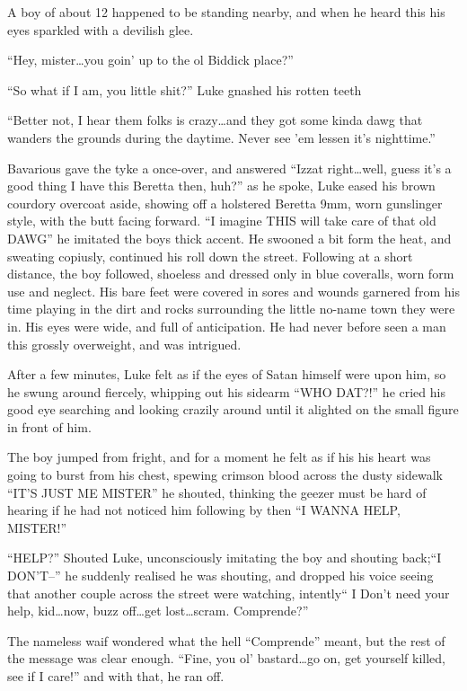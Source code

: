A boy of about 12 happened to be standing nearby, and when he heard
this his eyes sparkled with a devilish glee.

``Hey, mister{\ldots}you goin' up to the ol Biddick place?''

``So what if I am, you little shit?'' Luke gnashed his rotten
teeth

``Better not, I hear them folks is crazy{\ldots}and they got some kinda
dawg that wanders the grounds during the daytime. Never see 'em
lessen it's nighttime.''

Bavarious gave the tyke a once-over, and answered ``Izzat
right{\ldots}well, guess it's a good thing I have this Beretta then,
huh?'' as he spoke, Luke eased his brown courdory overcoat aside,
showing off a holstered Beretta 9mm, worn gunslinger style, with
the butt facing forward. ``I imagine THIS will take care of that old
DAWG'' he imitated the boys thick accent. He swooned a bit form the
heat, and sweating copiusly, continued his roll down the street.
Following at a short distance, the boy followed, shoeless and
dressed only in blue coveralls, worn form use and neglect. His bare
feet were covered in sores and wounds garnered from his time
playing in the dirt and rocks surrounding the little no-name town
they were in. His eyes were wide, and full of anticipation. He had
never before seen a man this grossly overweight, and was
intrigued.

After a few minutes, Luke felt as if the eyes of Satan himself were
upon him, so he swung around fiercely, whipping out his sidearm
``WHO DAT?!'' he cried his good eye searching and looking crazily
around until it alighted on the small figure in front of him.

The boy jumped from fright, and for a moment he felt as if his his
heart was going to burst from his chest, spewing crimson blood
across the dusty sidewalk ``IT'S JUST ME MISTER'' he shouted,
thinking the geezer must be hard of hearing if he had not noticed
him following by then ``I WANNA HELP, MISTER!''

``HELP?'' Shouted Luke, unconsciously imitating the boy and shouting
back;``I DON'T--'' he suddenly realised he was shouting, and dropped
his voice seeing that another couple across the street were
watching, intently`` I Don't need your help, kid{\ldots}now, buzz
off{\ldots}get lost{\ldots}scram. Comprende?''

The nameless waif wondered what the hell ``Comprende'' meant, but the
rest of the message was clear enough. ``Fine, you ol' bastard{\ldots}go
on, get yourself killed, see if I care!'' and with that, he ran
off.

